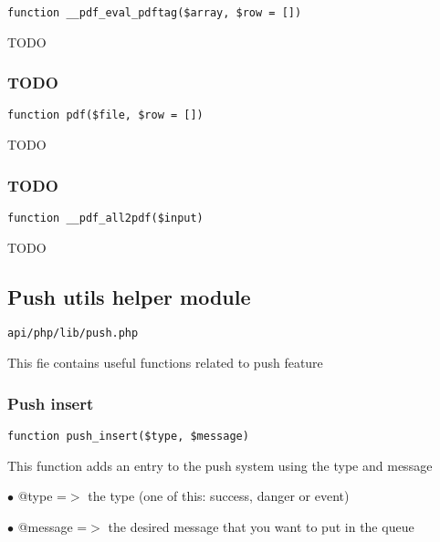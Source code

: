 \documentclass[a4paper]{article}
\begin{document}
\begin{lstlisting}
function __pdf_eval_pdftag($array, $row = [])
\end{lstlisting}

TODO

\hypertarget{toc514}{}
\subsubsection{TODO}

\begin{lstlisting}
function pdf($file, $row = [])
\end{lstlisting}

TODO

\hypertarget{toc515}{}
\subsubsection{TODO}

\begin{lstlisting}
function __pdf_all2pdf($input)
\end{lstlisting}

TODO

\hypertarget{toc516}{}
\subsection{Push utils helper module}

\begin{lstlisting}
api/php/lib/push.php
\end{lstlisting}

This fie contains useful functions related to push feature

\hypertarget{toc517}{}
\subsubsection{Push insert}

\begin{lstlisting}
function push_insert($type, $message)
\end{lstlisting}

This function adds an entry to the push system using the type and message

\begin{compactitem}
\item[\color{myblue}$\bullet$] @type    =$>$ the type (one of this: success, danger or event)
\item[\color{myblue}$\bullet$] @message =$>$ the desired message that you want to put in the queue
\end{compactitem}
\end{document}
